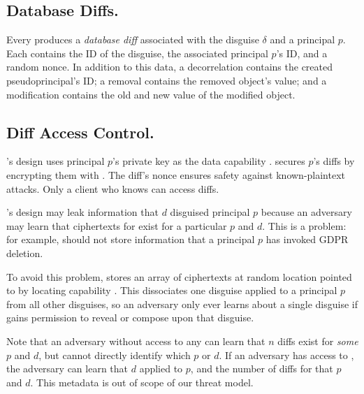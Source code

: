 \subsection{Database Diffs.}
Every  produces a \emph{database diff}  associated with the disguise $\delta$ and a principal $p$. 
%
Each  contains the ID of the disguise, the associated principal $p$'s ID,
and a random nonce.
%
In addition to this data, a decorrelation  contains the created pseudoprincipal's
ID; a removal  contains the removed object's value; and a modification
 contains the old and new value of the modified object.

\subsection{Diff Access Control.} 

\sys's design uses principal $p$'s private key  as the data capability . \sys
secures $p$'s diffs  by encrypting them with . The diff's nonce ensures safety
against known-plaintext attacks. 
Only a client who knows  can access diffs.

%

\sys's design may leak information that $d$ disguised principal $p$ because an adversary may learn
that ciphertexts for  exist for a particular $p$ and $d$.  This is a problem: for example,
\sys should not store information that a principal $p$ has invoked GDPR deletion.

To avoid this problem, \sys stores an array of  ciphertexts at random location pointed to
by locating capability .  This dissociates one disguise applied to a principal $p$ from
all other disguises, so an adversary only ever learns about a single disguise if \sys gains
permission to reveal or compose upon that disguise.

Note that an adversary without access to any  can learn that $n$ diffs exist for
\emph{some} $p$ and $d$, but cannot directly identify which $p$ or $d$.  If an adversary has access
to , the adversary can learn that $d$ applied to $p$, and the number of  diffs
for that $p$ and $d$. This metadata is out of scope of our threat model.

